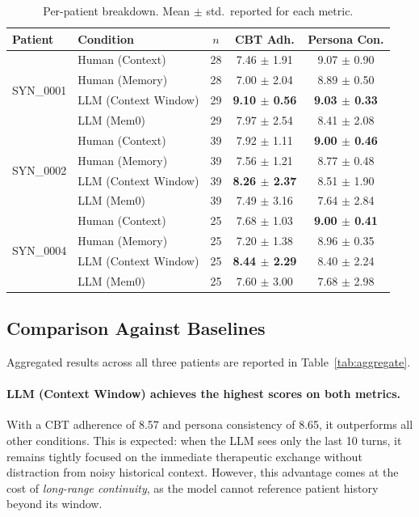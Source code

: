 \begin{table}[h]
\centering
\caption{Per-patient breakdown. Mean $\pm$ std.\ reported for each metric.}
\label{tab:perpatient}
\small
\begin{tabular}{llccc}
\toprule
\textbf{Patient} & \textbf{Condition} & $n$ & \textbf{CBT Adh.} & \textbf{Persona Con.} \\
\midrule
\multirow{4}{*}{SYN\_0001}
 & Human (Context) & 28 & 7.46 $\pm$ 1.91 & 9.07 $\pm$ 0.90 \\
 & Human (Memory) & 28 & 7.00 $\pm$ 2.04 & 8.89 $\pm$ 0.50 \\
 & LLM (Context Window) & 29 & \textbf{9.10 $\pm$ 0.56} & \textbf{9.03 $\pm$ 0.33} \\
 & LLM (Mem0) & 29 & 7.97 $\pm$ 2.54 & 8.41 $\pm$ 2.08 \\
\midrule
\multirow{4}{*}{SYN\_0002}
 & Human (Context) & 39 & 7.92 $\pm$ 1.11 & \textbf{9.00 $\pm$ 0.46} \\
 & Human (Memory) & 39 & 7.56 $\pm$ 1.21 & 8.77 $\pm$ 0.48 \\
 & LLM (Context Window) & 39 & \textbf{8.26 $\pm$ 2.37} & 8.51 $\pm$ 1.90 \\
 & LLM (Mem0) & 39 & 7.49 $\pm$ 3.16 & 7.64 $\pm$ 2.84 \\
\midrule
\multirow{4}{*}{SYN\_0004}
 & Human (Context) & 25 & 7.68 $\pm$ 1.03 & \textbf{9.00 $\pm$ 0.41} \\
 & Human (Memory) & 25 & 7.20 $\pm$ 1.38 & 8.96 $\pm$ 0.35 \\
 & LLM (Context Window) & 25 & \textbf{8.44 $\pm$ 2.29} & 8.40 $\pm$ 2.24 \\
 & LLM (Mem0) & 25 & 7.60 $\pm$ 3.00 & 7.68 $\pm$ 2.98 \\
\bottomrule
\end{tabular}
\end{table}

\subsection{Comparison Against Baselines}

Aggregated results across all three patients are reported in Table~\ref{tab:aggregate}.

\paragraph{LLM (Context Window) achieves the highest scores on both metrics.} With a CBT adherence of 8.57 and persona consistency of 8.65, it outperforms all other conditions. This is expected: when the LLM sees only the last 10 turns, it remains tightly focused on the immediate therapeutic exchange without distraction from noisy historical context. However, this advantage comes at the cost of \emph{long-range continuity}, as the model cannot reference patient history beyond its window.

